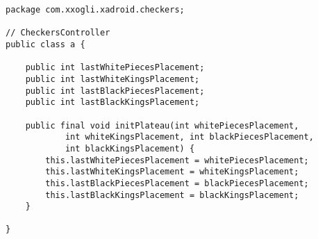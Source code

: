 \begin{lstlisting}[caption=a.java (CheckersController.java), label=lstPlacementA]
package com.xxogli.xadroid.checkers;

// CheckersController
public class a {

	public int lastWhitePiecesPlacement;
	public int lastWhiteKingsPlacement;
	public int lastBlackPiecesPlacement;
	public int lastBlackKingsPlacement;

	public final void initPlateau(int whitePiecesPlacement,
			int whiteKingsPlacement, int blackPiecesPlacement,
			int blackKingsPlacement) {
		this.lastWhitePiecesPlacement = whitePiecesPlacement;
		this.lastWhiteKingsPlacement = whiteKingsPlacement;
		this.lastBlackPiecesPlacement = blackPiecesPlacement;
		this.lastBlackKingsPlacement = blackKingsPlacement;
	}

}
\end{lstlisting}